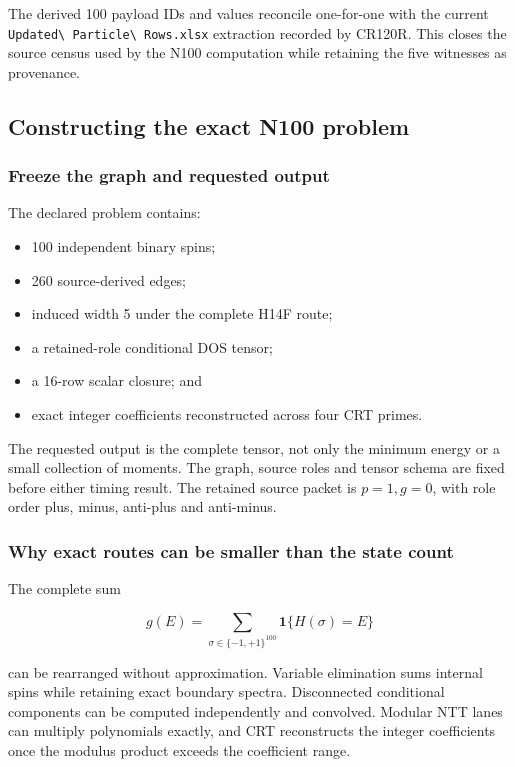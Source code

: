 The derived 100 payload IDs and values reconcile one-for-one with the
current \nolinkurl{Updated\ Particle\ Rows.xlsx} extraction recorded by
CR120R. This closes the source census used by the N100 computation while
retaining the five witnesses as provenance.

\subsection{Constructing the exact N100
problem}\label{viii-ch01-constructing-the-exact-n100-problem}

\subsubsection{Freeze the graph and requested
output}\label{viii-ch01-freeze-the-graph-and-requested-output}

The declared problem contains:

\begin{itemize}
\tightlist
\item
  100 independent binary spins;
\item
  260 source-derived edges;
\item
  induced width 5 under the complete H14F route;
\item
  a retained-role conditional DOS tensor;
\item
  a 16-row scalar closure; and
\item
  exact integer coefficients reconstructed across four CRT primes.
\end{itemize}

The requested output is the complete tensor, not only the minimum energy
or a small collection of moments. The graph, source roles and tensor schema are fixed before either timing result. The retained source packet is $p=1,g=0$, with role order plus, minus, anti-plus and anti-minus.

\subsubsection{Why exact routes can be smaller than the state
count}\label{viii-ch01-why-exact-routes-can-be-smaller-than-the-state-count}

The complete sum

\[
g(E)=\sum_{\sigma\in\{-1,+1\}^{100}}
\mathbf 1\{H(\sigma)=E\}
\]

can be rearranged without approximation. Variable elimination sums
internal spins while retaining exact boundary spectra. Disconnected
conditional components can be computed independently and convolved.
Modular NTT lanes can multiply polynomials exactly, and CRT reconstructs
the integer coefficients once the modulus product exceeds the
coefficient range.

